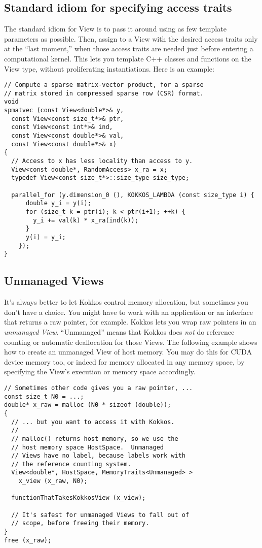 \subsection{Standard idiom for specifying access traits}

The standard idiom for View is to pass it around using as few template
parameters as possible.  Then, assign to a View with the desired
access traits only at the ``last moment,'' when those access traits
are needed just before entering a computational kernel.  This lets you
template C++ classes and functions on the View type, without
proliferating instantiations.  Here is an example:

\begin{lstlisting}
// Compute a sparse matrix-vector product, for a sparse
// matrix stored in compressed sparse row (CSR) format.
void
spmatvec (const View<double*>& y, 
  const View<const size_t*>& ptr,
  const View<const int*>& ind,
  const View<const double*>& val,
  const View<const double*>& x)
{
  // Access to x has less locality than access to y.
  View<const double*, RandomAccess> x_ra = x;
  typedef View<const size_t*>::size_type size_type;

  parallel_for (y.dimension_0 (), KOKKOS_LAMBDA (const size_type i) {
      double y_i = y(i);
      for (size_t k = ptr(i); k < ptr(i+1); ++k) {
        y_i += val(k) * x_ra(ind(k));
      }
      y(i) = y_i;
    });
}
\end{lstlisting}

\subsection{Unmanaged Views}

It's always better to let Kokkos control memory allocation, but
sometimes you don't have a choice.  You might have to work with an
application or an interface that returns a raw pointer, for example.
Kokkos lets you wrap raw pointers in an \emph{unmanaged View}.
``Unmanaged'' means that Kokkos does \emph{not} do reference counting
or automatic deallocation for those Views.  The following example
shows how to create an unmanaged View of host memory.  You may do this
for CUDA device memory too, or indeed for memory allocated in any
memory space, by specifying the View's execution or memory space
accordingly.
\begin{lstlisting}
// Sometimes other code gives you a raw pointer, ...
const size_t N0 = ...;
double* x_raw = malloc (N0 * sizeof (double));
{
  // ... but you want to access it with Kokkos.
  //
  // malloc() returns host memory, so we use the 
  // host memory space HostSpace.  Unmanaged
  // Views have no label, because labels work with
  // the reference counting system.
  View<double*, HostSpace, MemoryTraits<Unmanaged> > 
    x_view (x_raw, N0);

  functionThatTakesKokkosView (x_view);

  // It's safest for unmanaged Views to fall out of
  // scope, before freeing their memory.
}
free (x_raw);
\end{lstlisting}

